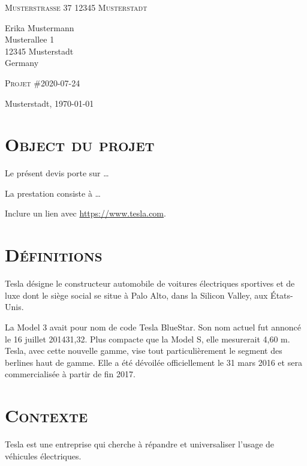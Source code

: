 \documentclass[10pt, a4paper]{article}
\begin{document}
\small
\ttfamily
\textsc{\textbf{}}
\textbullet{} \textsc{Musterstraße 37}
\textbullet{} \textsc{12345 Musterstadt}

\vspace{1em}

\normalsize \ttfamily
Erika Mustermann\\
Musterallee 1\\
12345 Musterstadt\\
Germany\\

\vspace{6em}
\rmfamily

\huge{\textsc{Projet \#2020-07-24} }

\begin{flushright}
  \small
  Musterstadt, \today
\end{flushright}

\vspace{1em}

\normalsize \rmfamily

    

    \section*{\textsc{Object du projet}}
    Le présent devis porte sur \ldots{}

    La prestation consiste à \ldots{}

    Inclure un lien avec \url{https://www.tesla.com}.
    \section*{\textsc{Définitions}}
    Tesla désigne le constructeur automobile de voitures électriques
    sportives et de luxe dont le siège social se situe à Palo Alto, dans
    la Silicon Valley, aux États-Unis.

    La Model 3 avait pour nom de code Tesla BlueStar. Son nom actuel fut
    annoncé le 16 juillet 201431,32. Plus compacte que la Model S, elle
    mesurerait 4,60 m. Tesla, avec cette nouvelle gamme, vise tout
    particulièrement le segment des berlines haut de gamme. Elle a été
    dévoilée officiellement le 31 mars 2016 et sera commercialisée à
    partir de fin 2017.
    \section*{\textsc{Contexte}}
    Tesla est une entreprise qui cherche à répandre et universaliser
    l'usage de véhicules électriques.
\end{document}
